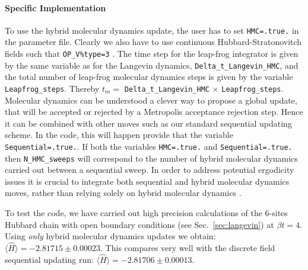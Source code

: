 \paragraph{Specific Implementation}
To  use  the    hybrid   molecular  dynamics  update,   the  user  has  to set \texttt{HMC=.true.}  in the  parameter  file.  Clearly  we  also  have  to use 
continuous  Hubbard-Stratonovitch  fields  such that
  \texttt{OP\_V\%type=3} . 
  The  time  step  for  the  leap-frog  integrator is  given  by  the   same  variable as for  the  Langevin dynamics, \texttt{Delta\_t\_Langevin\_HMC},   and  the  total  number of  leap-frog   molecular  dynamics  steps  is  given by  the  variable  \texttt{Leapfrog\_steps}.  Thereby   $ t_m = $ \texttt{Delta\_t\_Langevin\_HMC} $\times $ \texttt{Leapfrog\_steps}.  
Molecular  dynamics can  be  understood  a  clever  way  to  propose  a  global update,  that  will be  accepted  or  rejected  by  a  Metropolis   acceptance  rejection step.   Hence  it  can be combined  with  other   moves  such as  our  standard  sequential  updating scheme.   In the  code,  this  will happen  provide  that  the variable  \texttt{Sequential=.true.}.    If  both  the variables \texttt{HMC=.true.}   and   \texttt{Sequential=.true.}   then \texttt{N\_HMC\_sweeps}    will
correspond  to the  number  of   hybrid   molecular  dynamics   carried out between  a  sequential  sweep. 
In order to address potential ergodicity issues \cite{Beyl17} it is crucial to integrate both sequential and hybrid molecular dynamics moves,
 rather than relying solely on hybrid molecular dynamics \cite{Imada88}. 
 
 To  test  the  code,  we  have  carried  out  high precision calculations  of  the  6-sites   Hubbard  chain  with  open boundary  conditions  (see  Sec.~\ref{sec:langevin})  at  $\beta t  = 4$.     Using \textit{only}   hybrid   molecular  dynamics  updates  we  obtain:  $ \langle  \hat{H} \rangle = -2.81715     \pm 0.00023 $.  This  compares  very  well  with  the  discrete  field    sequential  updating run: $ \langle  \hat{H} \rangle = -2.81706   \pm 0.00013 $. 

